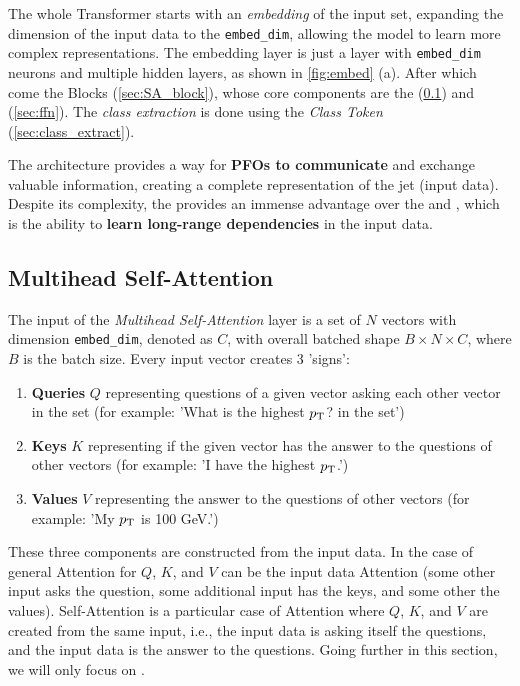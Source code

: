 The whole Transformer starts with an \emph{embedding} of the input set, expanding the dimension of the input data to the \texttt{embed\_dim}, allowing the model to learn more complex representations.
The embedding layer is just a \fc layer with \texttt{embed\_dim} neurons and multiple hidden layers, as shown in \cref{fig:embed} (a).
After which come the \SA Blocks (\cref{sec:SA_block}), whose core components are the \MHSA (\cref{sec:mhsa}) and \FFN (\cref{sec:ffn}).
The \emph{class extraction} is done using the \emph{Class Token} (\cref{sec:class_extract}).

The \trans architecture provides a way for \textbf{PFOs to communicate} and exchange valuable information, creating a complete representation of the jet (input data).
Despite its complexity, the \trans provides an immense advantage over the \PFN and \EFN, which is the ability to \textbf{learn long-range dependencies} in the input data.

\subsection{Multihead Self-Attention}
\label{sec:mhsa}
The input of the \emph{Multihead Self-Attention} layer is a set of $N$ vectors with dimension \texttt{embed\_dim}, denoted as $C$, with overall batched shape $B \times N \times C$, where $B$ is the batch size.
Every input vector creates 3 'signs':
\begin{enumerate}
    \item \textbf{Queries} $Q$ representing questions of a given vector asking each other vector in the set (for example: 'What is the highest $p_\text{T}$? in the set')
    \item \textbf{Keys} $K$ representing if the given vector has the answer to the questions of other vectors (for example: 'I have the highest $p_\text{T}$.')
    \item \textbf{Values} $V$ representing the answer to the questions of other vectors (for example: 'My $p_\text{T}$ is 100 GeV.')
\end{enumerate}
These three components are constructed from the input data. 
In the case of general Attention for $Q$, $K$, and $V$ can be the input data Attention (some other input asks the question, some additional input has the keys, and some other the values).
Self-Attention is a particular case of Attention where $Q$, $K$, and $V$ are created from the same input, i.e., the input data is asking itself the questions, and the input data is the answer to the questions.
Going further in this section, we will only focus on \SA.

